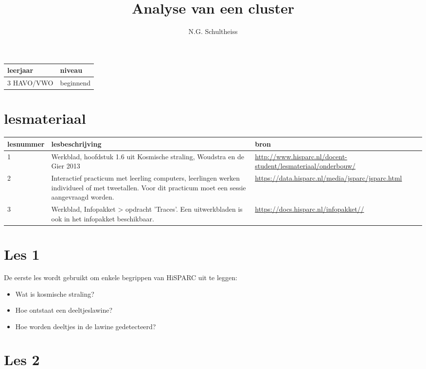 

\title{Analyse van een cluster}
\author{N.G. Schultheiss}



\maketitle

\begin{tabular}{|>{\raggedright}p{3cm}|>{\raggedright}p{12cm}|}
\hline
leerjaar & niveau \tabularnewline
\hline
3 HAVO/VWO & beginnend \tabularnewline
\hline
\end{tabular}

\section{lesmateriaal}

\begin{tabular}{ |>{\raggedright}p{2.5cm}|>{\raggedright}p{8cm}|>{\raggedright}p{4cm}|}
\hline
lesnummer & lesbeschrijving & bron \tabularnewline
\hline
1 &
Werkblad, hoofdstuk 1.6 uit Kosmische straling, Woudstra en de Gier 2013 &
\url{http://www.hisparc.nl/docent-student/lesmateriaal/onderbouw/} \tabularnewline
\hline
2 &
Interactief practicum met leerling computers, leerlingen werken individueel of met tweetallen. Voor dit practicum moet een sessie aangevraagd worden. &
\url{https://data.hisparc.nl/media/jsparc/jsparc.html} \tabularnewline
\hline
3 &
Werkblad, Infopakket > opdracht 'Traces'. Een uitwerkbladen is ook in het infopakket beschikbaar. &
\url{https://docs.hisparc.nl/infopakket//} \tabularnewline
\hline
\end{tabular}

\section{Les 1}

De eerste les wordt gebruikt om enkele begrippen van HiSPARC uit te leggen:

\begin{itemize}
\item Wat is kosmische straling?
\item Hoe ontstaat een deeltjeslawine?
\item Hoe worden deeltjes in de lawine gedetecteerd?
\end{itemize}

\section{Les 2}

